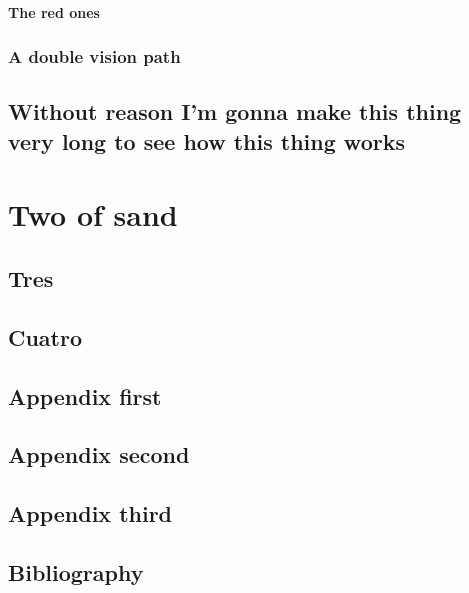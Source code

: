 \documentclass[draft]{qx-files/qx-book}
\begin{document}
\subsection{The red ones}

\lipsum[2]

\section{A double vision path}

\lipsum

\chapter[Título largo]{Without reason I'm gonna make this thing very long to see how this thing works}
\lipsum


\part{Two of sand}

\chapter{Tres}
\lipsum


\chapter{Cuatro}
\lipsum[1]

\appendix

\chapter{Appendix first}


\lipsum[1]

\chapter{Appendix second}


\lipsum[1]

\chapter{Appendix third}


\lipsum[1]

\backmatter

\chapter{Bibliography}

\lipsum
\end{document}
